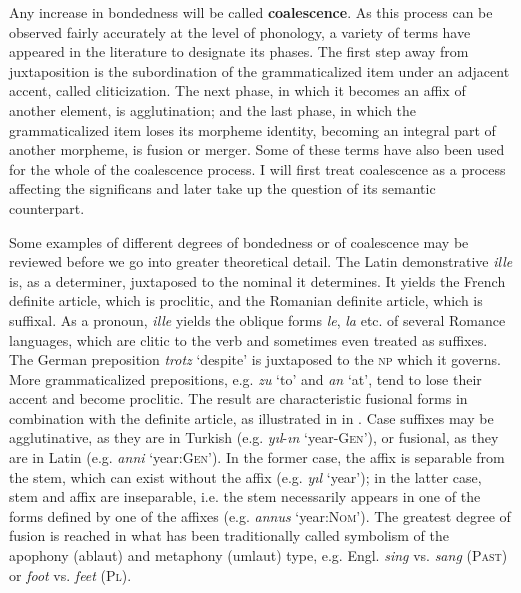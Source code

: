 Any increase in bondedness will be called \textbf{coalescence}. As this process can be observed fairly accurately at the level of phonology, a variety of terms have appeared in the literature to designate its phases. The first step away from juxtaposition is the subordination of the grammaticalized item under an adjacent accent, called cliticization. The next phase, in which it becomes an affix of another element, is agglutination; and the last phase, in which the grammaticalized item loses its morpheme identity, becoming an integral part of another morpheme, is fusion or merger. Some of these terms have also been used for the whole of the coalescence process. I will first treat coalescence as a process affecting the significans and later take up the question of its semantic counterpart.

Some examples of different degrees of bondedness or of coalescence may be reviewed before we go into greater theoretical detail. The Latin demonstrative \textit{ille} is, as a determiner, juxtaposed to the nominal it determines. It yields the French definite article, which is proclitic, and the Romanian definite article, which is suffixal. As a pronoun, \textit{ille} yields the oblique forms \textit{le}, \textit{la} etc. of several Romance languages, which are clitic to the verb and sometimes even treated as suffixes. The German preposition \textit{trotz} ‘despite’ is juxtaposed to the \textsc{np} which it governs. More grammaticalized prepositions, e.g. \textit{zu} ‘to’ and \textit{an} ‘at’, tend to lose their accent and become proclitic. The result are characteristic fusional forms in combination with the definite article, as illustrated in  in . Case suffixes may be agglutinative, as they are in Turkish (e.g. \textit{yıl}{}-\textit{ın} ‘year-\textsc{Gen}’), or fusional, as they are in Latin (e.g. \textit{anni} ‘year:\textsc{Gen}’). In the former case, the affix is separable from the stem, which can exist without the affix (e.g. \textit{yıl} ‘year’); in the latter case, stem and affix are inseparable, i.e. the stem necessarily appears in one of the forms defined by one of the affixes (e.g. \textit{annus} ‘year:\textsc{Nom}’). The greatest degree of fusion is reached in what has been traditionally called symbolism of the apophony (ablaut) and metaphony (umlaut) type, e.g. Engl. \textit{sing} vs. \textit{sang} (\textsc{Past}) or \textit{foot} vs. \textit{feet} (\textsc{Pl}).

